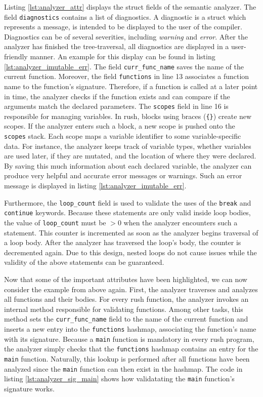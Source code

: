 Listing \ref{lst:analyzer_attr} displays the struct fields of the semantic analyzer.
The field \texttt{diagnostics} contains a list of diagnostics.
A diagnostic is a struct which represents a message, is intended to be displayed to the user of the compiler.
Diagnostics can be of several severities, including \emph{warning} and \emph{error}.
After the analyzer has finished the tree-traversal, all diagnostics are displayed in a user-friendly manner.
An example for this display can be found in listing \ref{lst:analyzer_imutable_err}.
The field \texttt{curr\_func\_name} saves the name of the current function.
Moreover, the field \texttt{functions} in line 13 associates a function name to the function's signature.
Therefore, if a function is called at a later point in time, the analyzer checks if the function exists and can compare if the arguments match the declared parameters.
The \texttt{scopes} field in line 16 is responsible for managing variables.
In rush, blocks using braces (\texttt{\{\}}) create new scopes.
If the analyzer enters such a block, a new scope is pushed onto the \texttt{scopes} stack.
Each scope maps a variable identifier to some variable-specific data.
For instance, the analyzer keeps track of variable types, whether variables are used later, if they are mutated, and the location of where they were declared.
By saving this much information about each declared variable, the analyzer can produce very helpful and accurate error messages or warnings.
Such an error message is displayed in listing \ref{lst:analyzer_imutable_err}.


Furthermore, the \texttt{loop\_count} field is used to validate the uses of the \texttt{break} and \texttt{continue} keywords.
Because these statements are only valid inside loop bodies, the value of \texttt{loop\_count} must be $> 0$ when the analyzer encounters such a statement.
This counter is incremented as soon as the analyzer begins traversal of a loop body.
After the analyzer has traversed the loop's body, the counter is decremented again.
Due to this design, nested loops do not cause issues while the validity of the above statements can be guaranteed.

Now that some of the important attributes have been highlighted, we can now consider the example from above again.
First, the analyzer traverses and analyzes all functions and their bodies.
For every rush function, the analyzer invokes an internal method responsible for validating functions.
Among other tasks, this method sets the \texttt{curr\_func\_name} field to the name of the current function and
inserts a new entry into the \texttt{functions} hashmap, associating the function's name with its signature.
Because a \texttt{main} function is mandatory in every rush program,
the analyzer simply checks that the \texttt{functions} hashmap contains an entry for the \texttt{main} function.
Naturally, this lookup is performed after all functions have been analyzed since the \texttt{main} function can then exist in the hashmap.
The code in listing \ref{lst:analyzer_sig_main} shows how validatating the \texttt{main} function's signature works.

